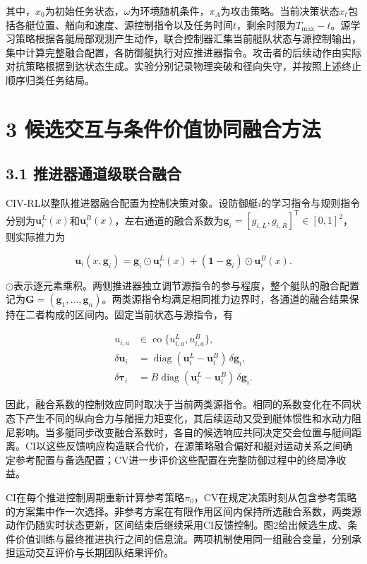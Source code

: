 \documentclass[UTF8,a4paper,zihao=5,fontset=none]{ctexart}
\begin{document}
其中，\(x_0\)为初始任务状态，\(\omega\)为环境随机条件，\(\pi_A\)为攻击策略。当前决策状态\(x_t\)包括各艇位置、艏向和速度、源控制指令以及任务时间\(t\)，剩余时限为\(T_{\max}-t\)。源学习策略根据各艇局部观测产生动作，联合控制器汇集当前艇队状态与源控制输出，集中计算完整融合配置，各防御艇执行对应推进器指令。攻击者的后续动作由实际对抗策略根据到达状态生成。实验分别记录物理突破和径向失守，并按照上述终止顺序归类任务结局。

\section*{3
候选交互与条件价值协同融合方法}

\subsection*{3.1
推进器通道级联合融合}

CIV-RL以整队推进器融合配置为控制决策对象。设防御艇\(i\)的学习指令与规则指令分别为\(\boldsymbol u_i^L(x)\)和\(\boldsymbol u_i^B(x)\)，左右通道的融合系数为\(\boldsymbol g_i=[g_{i,L},g_{i,R}]^{\mathsf T}\in[0,1]^2\)，则实际推力为

\[
\boldsymbol u_i(x,\boldsymbol g_i)
=\boldsymbol g_i\odot\boldsymbol u_i^L(x)
+(\boldsymbol 1-\boldsymbol g_i)\odot\boldsymbol u_i^B(x).
\tag{6}
\]

\(\odot\)表示逐元素乘积。两侧推进器独立调节源指令的参与程度，整个艇队的融合配置记为\(\boldsymbol G=(\boldsymbol g_1,\ldots,\boldsymbol g_n)\)。两类源指令均满足相同推力边界时，各通道的融合结果保持在二者构成的区间内。固定当前状态与源指令，有

\[
\begin{aligned}
u_{i,a}&\in\operatorname{co}\{u_{i,a}^L,u_{i,a}^B\},\\
\delta\boldsymbol u_i
&=\operatorname{diag}(\boldsymbol u_i^L-\boldsymbol u_i^B)\,\delta\boldsymbol g_i,\\
\delta\boldsymbol\tau_i
&=B\operatorname{diag}(\boldsymbol u_i^L-\boldsymbol u_i^B)\,\delta\boldsymbol g_i.
\end{aligned}
\tag{7}
\]

因此，融合系数的控制效应同时取决于当前两类源指令。相同的系数变化在不同状态下产生不同的纵向合力与艏摇力矩变化，其后续运动又受到艇体惯性和水动力阻尼影响。当多艇同步改变融合系数时，各自的候选响应共同决定交会位置与艇间距离。CI以这些反馈响应构造联合代价，在源策略融合偏好和艇对运动关系之间确定参考配置与备选配置；CV进一步评价这些配置在完整防御过程中的终局净收益。

CI在每个推进控制周期重新计算参考策略\(\pi_0\)，CV在规定决策时刻从包含参考策略的方案集中作一次选择。非参考方案在有限作用区间内保持所选融合系数，两类源动作仍随实时状态更新，区间结束后继续采用CI反馈控制。图2给出候选生成、条件价值训练与最终推进执行之间的信息流。两项机制使用同一组融合变量，分别承担运动交互评价与长期团队结果评价。
\end{document}

